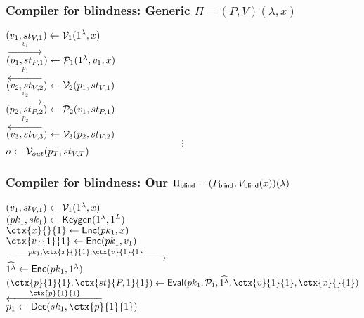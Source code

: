 \documentclass{beamer}
\begin{document}
\begin{frame}
	\frametitle{Compiler for blindness: Generic $\Pi=(P, V)(\lambda, x)$}
	$(v_1, st_{V, 1})\leftarrow\mathcal{V}_1(1^\lambda, x)$
	\pause
	\\\hspace*{\fill}$\xrightarrow{\qquad v_1\qquad}$\hspace*{\fill}
	\pause
	\\\hspace*{\fill}$(p_1, st_{P, 1})\leftarrow\mathcal{P}_1(1^\lambda, v_1, x)$
	\pause
	\\\hspace*{\fill}$\xleftarrow{\qquad p_1\qquad}$\hspace*{\fill}
	\pause
	\\$(v_2, st_{V, 2})\leftarrow\mathcal{V}_2(p_1, st_{V, 1})$
	\pause
	\\\hspace*{\fill}$\xrightarrow{\qquad v_2\qquad}$\hspace*{\fill}
	\pause
	\\\hspace*{\fill}$(p_2, st_{P, 2})\leftarrow\mathcal{P}_2(v_1, st_{P, 1})$
	\pause
	\\\hspace*{\fill}$\xleftarrow{\qquad p_2\qquad}$\hspace*{\fill}
	\pause
	\\$(v_3, st_{V, 3})\leftarrow\mathcal{V}_3(p_2, st_{V, 2})$
	\pause
	$$\vdots$$
	\pause
	$o\leftarrow\mathcal{V}_{out}(p_T, st_{V,T})$
\end{frame}

\begin{frame}
	\frametitle{Compiler for blindness: Our $\Pi_{\mathsf{blind}}=(P_{\mathsf{blind}}, V_{\mathsf{blind}}(x))(\lambda)$}
	$(v_1, st_{V, 1})\leftarrow\mathcal{V}_1(1^\lambda, x)$
	\pause
	\\$(pk_1, sk_1)\leftarrow\mathsf{Keygen}(1^\lambda, 1^L)$
	\pause
	\\$\ctx{x}{}{1}\leftarrow\Enc(pk_1, x)$
	\pause
	\\$\ctx{v}{1}{1}\leftarrow\Enc(pk_1, v_1)$
	\pause
	\\\hspace*{\fill}$\xrightarrow{\qquad pk_1, \ctx{x}{}{1}, \ctx{v}{1}{1}\qquad}$\hspace*{\fill}
	\pause
	\\\hspace*{\fill}$\widehat{1^\lambda}\leftarrow\mathsf{Enc}(pk_1, 1^\lambda)$
	\pause
	\\\hspace*{\fill}$(\ctx{p}{1}{1}, \ctx{st}{P, 1}{1})\leftarrow\Eval(pk_1, \cP_1, \widehat{1^\lambda}, \ctx{v}{1}{1}, \ctx{x}{}{1})$
	\pause
	\\\hspace*{\fill}$\xleftarrow{\qquad \ctx{p}{1}{1}\qquad}$\hspace*{\fill}
	\pause
	\\$p_1\leftarrow\Dec(sk_1, \ctx{p}{1}{1})$
\end{frame}
\end{document}
